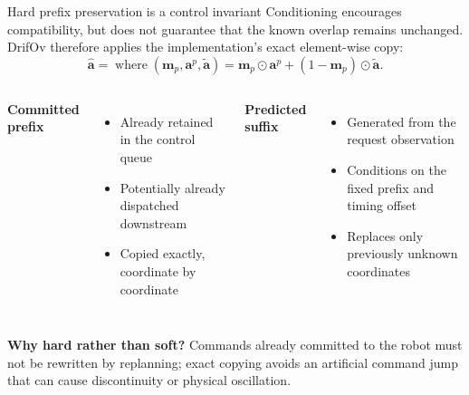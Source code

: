 \documentclass[aspectratio=169,10pt]{beamer}
\newcommand{\vect}[1]{\mathbf{#1}}
\begin{document}
\begin{frame}{Hard prefix preservation is a control invariant}
  Conditioning encourages compatibility, but does not guarantee that the known
  overlap remains unchanged. DrifOv therefore applies the implementation's exact
  element-wise copy:
  \[
    \hat{\vect{a}}
    =
    \operatorname{where}
      \left(\vect{m}_p,\vect{a}^{p},\tilde{\vect{a}}\right)
    =
    \vect{m}_p\odot\vect{a}^{p}
    +(1-\vect{m}_p)\odot\tilde{\vect{a}}.
  \]

  \begin{columns}[T]
      \textbf{Committed prefix}
      \begin{itemize}
        \item Already retained in the control queue
        \item Potentially already dispatched downstream
        \item Copied exactly, coordinate by coordinate
      \end{itemize}
      \textbf{Predicted suffix}
      \begin{itemize}
        \item Generated from the request observation
        \item Conditions on the fixed prefix and timing offset
        \item Replaces only previously unknown coordinates
      \end{itemize}
  \end{columns}

  \vspace{0.4em}
  \textbf{Why hard rather than soft?} Commands already committed to the robot
  must not be rewritten by replanning; exact copying avoids an artificial command
  jump that can cause discontinuity or physical oscillation.
\end{frame}
\end{document}
